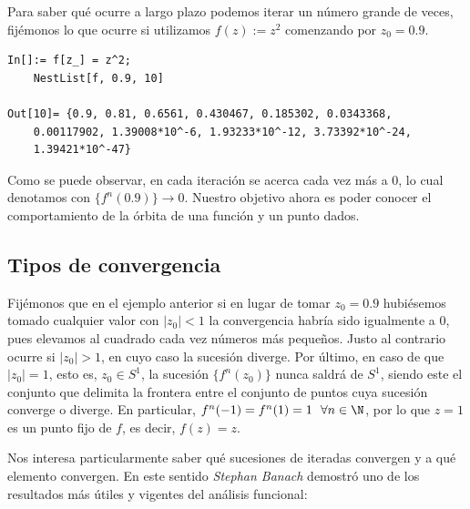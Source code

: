 Para saber qué ocurre a largo plazo podemos iterar un número grande de veces, fijémonos lo que ocurre si utilizamos $f(z):=z^2$ comenzando por $z_0=0.9$.

\begin{verbatim}
In[]:= f[z_] = z^2;
    NestList[f, 0.9, 10]
    
Out[10]= {0.9, 0.81, 0.6561, 0.430467, 0.185302, 0.0343368,
    0.00117902, 1.39008*10^-6, 1.93233*10^-12, 3.73392*10^-24, 
    1.39421*10^-47}
\end{verbatim}

Como se puede observar, en cada iteración se acerca cada vez más a $0$, lo cual denotamos con $\{f^n(0.9)\}\rightarrow 0$. Nuestro objetivo ahora es poder conocer el comportamiento de la órbita de una función y un punto dados. 

\subsection{Tipos de convergencia}

Fijémonos que en el ejemplo anterior si en lugar de tomar $z_0=0.9$ hubiésemos tomado cualquier valor con $|z_0|<1$ la convergencia habría sido igualmente a $0$, pues elevamos al cuadrado cada vez números más pequeños. Justo al contrario ocurre si $|z_0|>1$, en cuyo caso la sucesión diverge. Por último, en caso de que $|z_0|=1$, esto es, $z_0\in S^1$, la sucesión $\{f^n(z_0)\}$ nunca saldrá de $S^1$, siendo este el conjunto que delimita la frontera entre el conjunto de puntos cuya sucesión converge o diverge. En particular, $f^n(-1)=f^n(1)=1\ \ \forall n\in\N$, por lo que $z=1$ es un punto fijo de $f$, es decir, $f(z)=z$. 

Nos interesa particularmente saber qué sucesiones de iteradas convergen y a qué elemento convergen. En este sentido \textit{Stephan Banach} demostró uno de los resultados más útiles y vigentes del análisis funcional:

